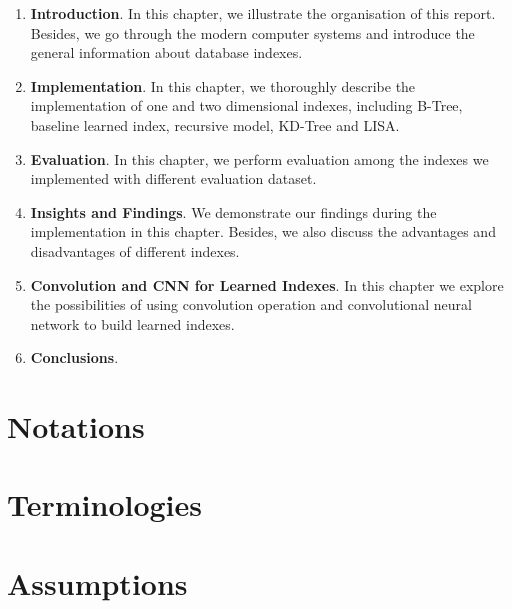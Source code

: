 \begin{enumerate}
	\item \textbf{Introduction}. In this chapter, we illustrate the organisation of this report. Besides, we go through the modern computer systems and introduce the general information about database indexes.
	\item \textbf{Implementation}. In this chapter, we thoroughly describe the implementation of one and two dimensional indexes, including B-Tree, baseline learned index, recursive model, KD-Tree and LISA.
	\item \textbf{Evaluation}. In this chapter, we perform evaluation among the indexes we implemented with different evaluation dataset. 
	\item \textbf{Insights and Findings}. We demonstrate our findings during the implementation in this chapter. Besides, we also discuss the advantages and disadvantages of different indexes.
	\item \textbf{Convolution and CNN for Learned Indexes}. In this chapter we explore the possibilities of using convolution operation and convolutional neural network to build learned indexes.
	\item \textbf{Conclusions}. 
\end{enumerate}

\section{Notations}



\section{Terminologies}



\section{Assumptions}




